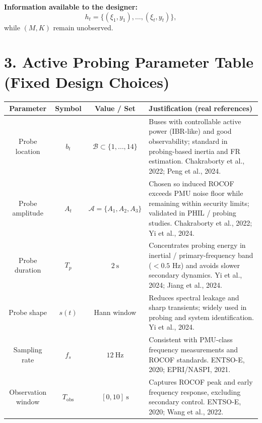 \textbf{Information available to the designer:}
\[
h_t=\{(\xi_1,y_1),\dots,(\xi_t,y_t)\},
\]
while $(M,K)$ remain unobserved.


\section*{3. Active Probing Parameter Table (Fixed Design Choices)}

\begin{center}
\renewcommand{\arraystretch}{1.35}
\begin{tabular}{|c|c|c|p{4.6in}|}
\hline
\textbf{Parameter} & \textbf{Symbol} & \textbf{Value / Set} & \textbf{Justification (real references)} \\
\hline
Probe location &
$b_t$ &
$\mathcal{B}\subset\{1,\dots,14\}$ &
Buses with controllable active power (IBR-like) and good observability; standard in probing-based inertia and FR estimation.
\newline
Chakraborty et al., 2022; Peng et al., 2024. \\
\hline
Probe amplitude &
$A_t$ &
$\mathcal{A}=\{A_1,A_2,A_3\}$ &
Chosen so induced ROCOF exceeds PMU noise floor while remaining within security limits; validated in PHIL / probing studies.
\newline
Chakraborty et al., 2022; Yi et al., 2024. \\
\hline
Probe duration &
$T_p$ &
$2~\mathrm{s}$ &
Concentrates probing energy in inertial / primary-frequency band ($<0.5$ Hz) and avoids slower secondary dynamics.
\newline
Yi et al., 2024; Jiang et al., 2024. \\
\hline
Probe shape &
$s(t)$ &
Hann window &
Reduces spectral leakage and sharp transients; widely used in probing and system identification.
\newline
Yi et al., 2024. \\
\hline
Sampling rate &
$f_s$ &
$12~\mathrm{Hz}$ &
Consistent with PMU-class frequency measurements and ROCOF standards.
\newline
ENTSO-E, 2020; EPRI/NASPI, 2021. \\
\hline
Observation window &
$T_{\text{obs}}$ &
$[0,10]~\mathrm{s}$ &
Captures ROCOF peak and early frequency response, excluding secondary control.
\newline
ENTSO-E, 2020; Wang et al., 2022. \\
\hline
\end{tabular}
\end{center}



